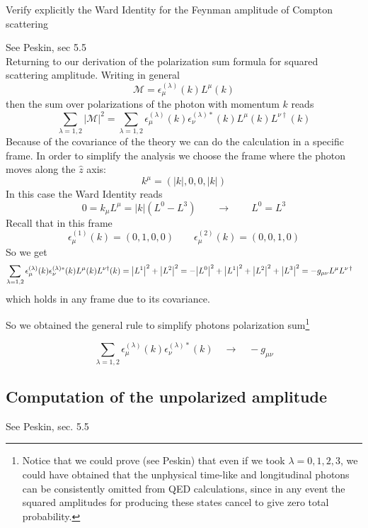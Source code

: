 \documentclass[TheoreticalPhy_ModB.tex]{subfiles}
\begin{document}
\begin{exercise}
Verify explicitly the Ward Identity for the Feynman amplitude of Compton scattering
\end{exercise}

\noindent
\textsf{See Peskin, sec 5.5}\\

Returning to our derivation of the polarization sum formula for squared scattering amplitude. Writing in general
\[\mathcal M=\epsilon_\mu^{(\lambda)}(k)L^\mu(k)\]
then the sum over polarizations of the photon with momentum $k$ reads
\[\sum_{\lambda=1,2}|\mathcal M|^2=\sum_{\lambda=1,2}\epsilon_\mu^{(\lambda)}(k)\epsilon_\nu^{(\lambda)*}(k)L^\mu(k)L^{\nu\dagger}(k)\]
Because of the covariance of the theory we can do the calculation in a specific frame. In order to simplify the analysis we choose the frame where the photon moves along the $\hat z$ axis:
\[k^\mu=(|k|,0,0,|k|)\]
In this case the Ward Identity reads
\[0=k_\mu L^\mu=|k|\left(L^0-L^3\right)\qquad\longrightarrow\qquad L^0=L^3\]
Recall that in this frame
\[\epsilon_\mu^{(1)}(k)=(0,1,0,0)\qquad\epsilon_\mu^{(2)}(k)=(0,0,1,0)\]
So we get
\begin{align*}\sum_{\lambda=1,2}\epsilon_\mu^{(\lambda)}(k)\epsilon_\nu^{(\lambda)*}(k)L^\mu(k)L^{\nu\dagger}(k)&=\abs{L^1}^2+\abs{L^2}^2=-\abs{L^0}^2+\abs{L^1}^2+\abs{L^2}^2+\abs{L^3}^2=-g_{\mu\nu}L^\mu L^{\nu\,\dagger}
\end{align*}
which holds in any frame due to its covariance.

So we obtained the general rule to simplify photons polarization sum\footnote{Notice that we could prove (see Peskin) that even if we took $\lambda=0,1,2,3$, we could have obtained that the unphysical time-like and longitudinal photons can be consistently omitted from QED calculations, since in any event the squared amplitudes for producing these states cancel to give zero total probability. }

\[
\boxed{
	\sum_{\lambda=1,2}\epsilon_\mu^{(\lambda)}(k)\epsilon_\nu^{(\lambda)*}(k)\quad\longrightarrow\quad-g_{\mu\nu}
}
\]

\subsection{Computation of the unpolarized amplitude}
\textsf{See Peskin, sec. 5.5}\\
\end{document}
